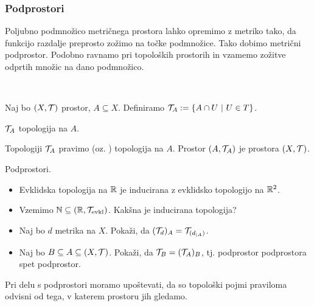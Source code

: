 \subsubsection{Podprostori}
Poljubno podmnožico metričnega prostora lahko opremimo z metriko tako, da funkcijo razdalje preprosto zožimo na točke podmnožice. Tako dobimo metrični podprostor. Podobno ravnamo pri topoloških prostorih in vzamemo zožitve odprtih množic na dano podmnožico.

\,

Naj bo $(X, \mathcal{T})$ prostor, $A \subseteq X$. Definiramo $\mathcal{T}_A := \left\{A \cap U \ | \ U \in T\right\}$.

\begin{trditev}
    $\mathcal{T}_A$ topologija na $A$.
\end{trditev}

\begin{definicija}
    Topologiji $\mathcal{T}_A$ pravimo  (oz. ) topologija na $A$.
    Prostor $(A, \mathcal{T}_A)$ je  prostora $(X, \mathcal{T})$.
\end{definicija}

\begin{primer}
    Podprostori.
    \begin{itemize}
        \item Evklidska topologija na $\mathbb{R}$ je inducirana z evklidsko topologijo na $\mathbb{R}^2$.
        \item Vzemimo $\mathbb{N} \subseteq (\mathbb{R}, \mathcal{T}_\text{evkl})$. Kakšna je inducirana topologija?
        \item Naj bo $d$ metrika na $X$. Pokaži, da $(\mathcal{T}_d)_A = \mathcal{T}_{(d_{|A})}$.        
        \item Naj bo $B \subseteq A \subseteq (X, \mathcal{T})$. Pokaži, da $\mathcal{T}_B = (\mathcal{T}_A)_B$, tj. podprostor podprostora spet podprostor.
    \end{itemize}
\end{primer}

\begin{opomba}
    Pri delu s podprostori moramo upoštevati, da so topološki pojmi praviloma odvisni od tega, v katerem prostoru jih gledamo.
\end{opomba}

